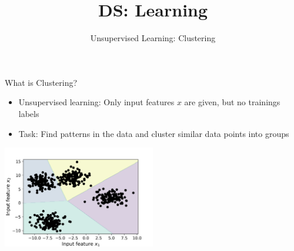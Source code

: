 \documentclass[aspectratio=169]{../latex_main/tntbeamer}  %
\title[Clustering]{DS: Learning}
\subtitle{Unsupervised Learning: Clustering}
\begin{document}
	
    \maketitle
    
    \begin{frame}[c]{What is Clustering?}
        \begin{itemize}
            \item Unsupervised learning: Only input features $x$ are given, but no trainings labels
            \item Task: Find patterns in the data and cluster similar data points into groups
        \end{itemize} 

        \centering
        \includegraphics[width=0.5\textwidth]{figure/clustering}

        
        
        
        
        
        
        
        

    \end{frame}
\end{document}
